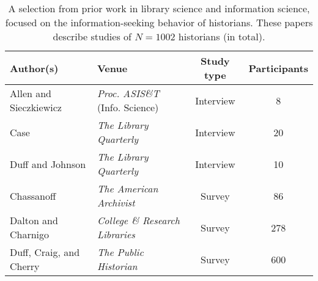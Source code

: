 
\begin{table}[h]
\begin{tabular}{@{}llcc@{}}
\toprule
Author(s) & Venue &  Study type & Participants  \\ \midrule
Allen and Sieczkiewicz \cite{allen}     &   \textit{Proc. ASIS\&T} (Info. Science)  &        Interview      &       8     \\
Case \cite{Case}     &  \textit{The Library Quarterly }   &     Interview         &     20       \\
Duff and Johnson     \cite{DuffJohnson}   &   \textit{The Library Quarterly}    &     Interview         &  10  \\     \midrule
Chassanoff \cite{Chassanoff}     &   \textit{The American Archivist}    &  Survey  &  86      \\
Dalton and Charnigo \cite{DaltonCharnigo}      &   \textit{College \& Research Libraries}    &   Survey           &     278       \\ 
Duff, Craig, and Cherry  \cite{DuffCraigCherry}      &   \textit{The Public Historian}    &    Survey         &    600         \\ \bottomrule
\end{tabular}\caption[A selection from prior work in library science and information science]{A selection from prior work in library science and information science, focused on the information-seeking behavior of historians.
These papers describe studies of $N=1002$ historians (in total).}\label{t:libraryscience}
\end{table}

